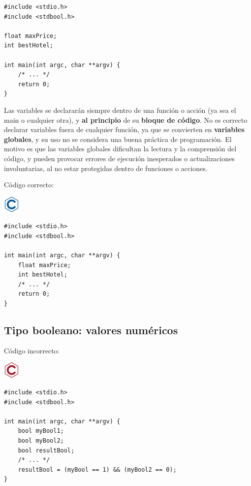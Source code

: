 \documentclass[
]{book}
\begin{document}
\begin{verbatim}
#include <stdio.h>
#include <stdbool.h>

float maxPrice;
int bestHotel;

int main(int argc, char **argv) {
    /* ... */
    return 0;
}
\end{verbatim}

Las variables se declararán siempre dentro de una función o acción (ya sea el main o cualquier otra), y \textbf{al principio} de su \textbf{bloque de código}. No es correcto declarar variables fuera de cualquier función, ya que se convierten en \textbf{variables globales}, y su uso no se considera una buena práctica de programación. El motivo es que las variables globales dificultan la lectura y la comprensión del código, y pueden provocar errores de ejecución inesperados o actualizaciones involuntarias, al no estar protegidas dentro de funciones o acciones.

Código correcto:

\includegraphics{./img/c.png}

\begin{verbatim}
#include <stdio.h>
#include <stdbool.h>

int main(int argc, char **argv) {
    float maxPrice;
    int bestHotel;
    /* ... */
    return 0;
}
\end{verbatim}

\hypertarget{tipo-booleano-valores-numuxe9ricos}{%
\subsection{Tipo booleano: valores numéricos}\label{tipo-booleano-valores-numuxe9ricos}}

Código incorrecto:

\includegraphics{./img/c_err.png}

\begin{verbatim}
#include <stdio.h>
#include <stdbool.h>

int main(int argc, char **argv) {
    bool myBool1;
    bool myBool2;
    bool resultBool;
    /* ... */
    resultBool = (myBool == 1) && (myBool2 == 0);
}
\end{verbatim}
\end{document}
